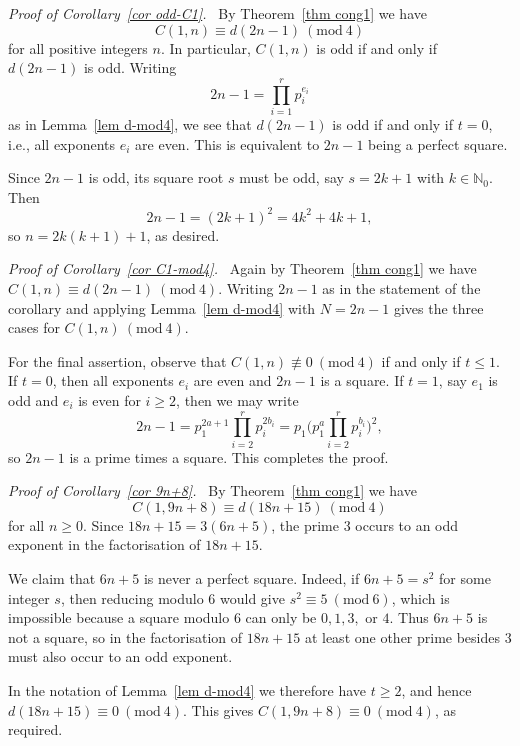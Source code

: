 \documentclass[reqno]{amsart}
\theoremstyle{definition}
\theoremstyle{plain}
\theoremstyle{remark}
\numberwithin{equation}{section}
\newcommand{\Mod}[1]{\ (\mathrm{mod}\ #1)}
\begin{document}
\emph{Proof of Corollary~\ref{cor odd-C1}.\ }
By Theorem~\ref{thm cong1} we have
\[
C(1,n)\equiv d(2n-1)\Mod{4}
\]
for all positive integers $n$. In particular, $C(1,n)$ is odd if and only if $d(2n-1)$ is odd. Writing
\[
2n-1 = \prod_{i=1}^{r} p_i^{e_i}
\]
as in Lemma~\ref{lem d-mod4}, we see that $d(2n-1)$ is odd if and only if $t=0$, i.e., all exponents $e_i$ are even. This is equivalent to $2n-1$ being a perfect square.

Since $2n-1$ is odd, its square root $s$ must be odd, say $s=2k+1$ with $k\in\mathbb{N}_0$. Then
\[
2n-1 = (2k+1)^2 = 4k^2+4k+1,
\]
so $n=2k(k+1)+1$, as desired.

\emph{Proof of Corollary~\ref{cor C1-mod4}.\ }
Again by Theorem~\ref{thm cong1} we have $C(1,n)\equiv d(2n-1)\Mod{4}$. Writing $2n-1$ as in the statement of the corollary and applying Lemma~\ref{lem d-mod4} with $N=2n-1$ gives the three cases for $C(1,n)\Mod{4}$.

For the final assertion, observe that $C(1,n)\not\equiv 0\Mod{4}$ if and only if $t\leq 1$. If $t=0$, then all exponents $e_i$ are even and $2n-1$ is a square. If $t=1$, say $e_1$ is odd and $e_i$ is even for $i\geq 2$, then we may write
\[
2n-1 = p_1^{2a+1} \prod_{i=2}^{r} p_i^{2b_i} = p_1\Big( p_1^{a} \prod_{i=2}^{r} p_i^{b_i} \Big)^2,
\]
so $2n-1$ is a prime times a square. This completes the proof.


\emph{Proof of Corollary~\ref{cor 9n+8}.\ }
By Theorem~\ref{thm cong1} we have
\[
C(1,9n+8)\equiv d(18n+15)\Mod{4}
\]
for all $n\geq 0$. Since $18n+15 = 3(6n+5)$, the prime $3$ occurs to an odd exponent in the factorisation of $18n+15$.

We claim that $6n+5$ is never a perfect square. Indeed, if $6n+5 = s^2$ for some integer $s$, then reducing modulo $6$ would give $s^2\equiv 5\Mod{6}$, which is impossible because a square modulo $6$ can only be $0,1,3,$ or $4$. Thus $6n+5$ is not a square, so in the factorisation of $18n+15$ at least one other prime besides $3$ must also occur to an odd exponent.

In the notation of Lemma~\ref{lem d-mod4} we therefore have $t\geq 2$, and hence $d(18n+15)\equiv 0\Mod{4}$. This gives $C(1,9n+8)\equiv 0\Mod{4}$, as required.
%
\end{document}
